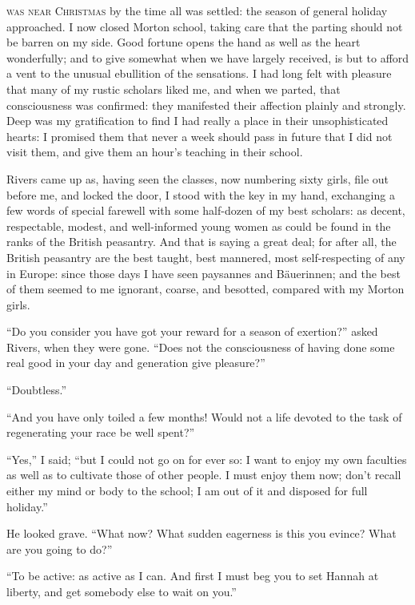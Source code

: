 
 \textsc{was near Christmas} by the time all was settled: the season of general
holiday approached. I now closed Morton school, taking care that the
parting should not be barren on my side. Good fortune opens the hand as
well as the heart wonderfully; and to give somewhat when we have largely
received, is but to afford a vent to the unusual ebullition of the
sensations. I had long felt with pleasure that many of my rustic
scholars liked me, and when we parted, that consciousness was confirmed:
they manifested their affection plainly and strongly. Deep was my
gratification to find I had really a place in their unsophisticated
hearts: I promised them that never a week should pass in future that I
did not visit them, and give them an hour's teaching in their school.

\Mr{} Rivers came up as, having seen the classes, now numbering sixty
girls, file out before me, and locked the door, I stood with the key in
my hand, exchanging a few words of special farewell with some half-dozen
of my best scholars: as decent, respectable, modest, and well-informed
young women as could be found in the ranks of the British peasantry.
And that is saying a great deal; for after all, the British peasantry
are the best taught, best mannered, most self-respecting of any in
Europe: since those days I have seen paysannes and Bäuerinnen; and the
best of them seemed to me ignorant, coarse, and besotted, compared with
my Morton girls.

\enquote{Do you consider you have got your reward for a season of
	exertion?} asked \Mr{} Rivers, when they were gone. \enquote{Does not the
	consciousness of having done some real good in your day and generation
	give pleasure?}

\enquote{Doubtless.}

\enquote{And you have only toiled a few months! Would not a life
	devoted to the task of regenerating your race be well spent?}

\enquote{Yes,} I said; \enquote{but I could not go on for ever so: I
	want to enjoy my own faculties as well as to cultivate those of other
	people. I must enjoy them now; don't recall either my mind or body to
	the school; I am out of it and disposed for full holiday.}

He looked grave. \enquote{What now? What sudden eagerness is this you
	evince? What are you going to do?}

\enquote{To be active: as active as I can. And first I must beg you to
	set Hannah at liberty, and get somebody else to wait on you.}

